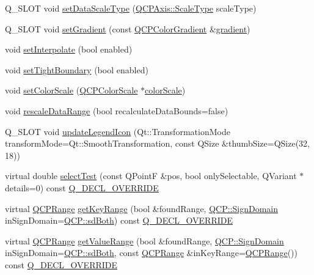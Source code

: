 \begin{DoxyCompactItemize}
\item 
Q\+\_\+\+S\+L\+OT void \hyperlink{class_q_c_p_color_map_a9d20aa08e3c1f20f22908c45b9c06511}{set\+Data\+Scale\+Type} (\hyperlink{class_q_c_p_axis_a36d8e8658dbaa179bf2aeb973db2d6f0}{Q\+C\+P\+Axis\+::\+Scale\+Type} scale\+Type)
\item 
Q\+\_\+\+S\+L\+OT void \hyperlink{class_q_c_p_color_map_a7313c78360471cead3576341a2c50377}{set\+Gradient} (const \hyperlink{class_q_c_p_color_gradient}{Q\+C\+P\+Color\+Gradient} \&\hyperlink{class_q_c_p_color_map_a9f967a971474e32345290b79cf107809}{gradient})
\item 
void \hyperlink{class_q_c_p_color_map_a484eaa8a5065cfc386b15375bf98b964}{set\+Interpolate} (bool enabled)
\item 
void \hyperlink{class_q_c_p_color_map_ad03221cc285e5f562a0b13d684b5576d}{set\+Tight\+Boundary} (bool enabled)
\item 
void \hyperlink{class_q_c_p_color_map_aa828921db364fe3c6af4619580ab85fd}{set\+Color\+Scale} (\hyperlink{class_q_c_p_color_scale}{Q\+C\+P\+Color\+Scale} $\ast$\hyperlink{class_q_c_p_color_map_a6bd82e0b042a2ec4d64f40853a3b05e3}{color\+Scale})
\item 
void \hyperlink{class_q_c_p_color_map_a856608fa3dd1cc290bcd5f29a5575774}{rescale\+Data\+Range} (bool recalculate\+Data\+Bounds=false)
\item 
Q\+\_\+\+S\+L\+OT void \hyperlink{class_q_c_p_color_map_a5d8158b62d55fcfeaabcb68ce0083e87}{update\+Legend\+Icon} (Qt\+::\+Transformation\+Mode transform\+Mode=Qt\+::\+Smooth\+Transformation, const Q\+Size \&thumb\+Size=Q\+Size(32, 18))
\item 
virtual double \hyperlink{class_q_c_p_color_map_afb4b843596addf58096082827a9e3450}{select\+Test} (const Q\+PointF \&pos, bool only\+Selectable, Q\+Variant $\ast$details=0) const \hyperlink{qcustomplot_8hh_a42cc5eaeb25b85f8b52d2a4b94c56f55}{Q\+\_\+\+D\+E\+C\+L\+\_\+\+O\+V\+E\+R\+R\+I\+DE}
\item 
virtual \hyperlink{class_q_c_p_range}{Q\+C\+P\+Range} \hyperlink{class_q_c_p_color_map_a985861974560f950af6cb7fae8c46267}{get\+Key\+Range} (bool \&found\+Range, \hyperlink{namespace_q_c_p_afd50e7cf431af385614987d8553ff8a9}{Q\+C\+P\+::\+Sign\+Domain} in\+Sign\+Domain=\hyperlink{namespace_q_c_p_afd50e7cf431af385614987d8553ff8a9aa38352ef02d51ddfa4399d9551566e24}{Q\+C\+P\+::sd\+Both}) const \hyperlink{qcustomplot_8hh_a42cc5eaeb25b85f8b52d2a4b94c56f55}{Q\+\_\+\+D\+E\+C\+L\+\_\+\+O\+V\+E\+R\+R\+I\+DE}
\item 
virtual \hyperlink{class_q_c_p_range}{Q\+C\+P\+Range} \hyperlink{class_q_c_p_color_map_a88134493aaf6b297af34eaab65264fff}{get\+Value\+Range} (bool \&found\+Range, \hyperlink{namespace_q_c_p_afd50e7cf431af385614987d8553ff8a9}{Q\+C\+P\+::\+Sign\+Domain} in\+Sign\+Domain=\hyperlink{namespace_q_c_p_afd50e7cf431af385614987d8553ff8a9aa38352ef02d51ddfa4399d9551566e24}{Q\+C\+P\+::sd\+Both}, const \hyperlink{class_q_c_p_range}{Q\+C\+P\+Range} \&in\+Key\+Range=\hyperlink{class_q_c_p_range}{Q\+C\+P\+Range}()) const \hyperlink{qcustomplot_8hh_a42cc5eaeb25b85f8b52d2a4b94c56f55}{Q\+\_\+\+D\+E\+C\+L\+\_\+\+O\+V\+E\+R\+R\+I\+DE}
\end{DoxyCompactItemize}

